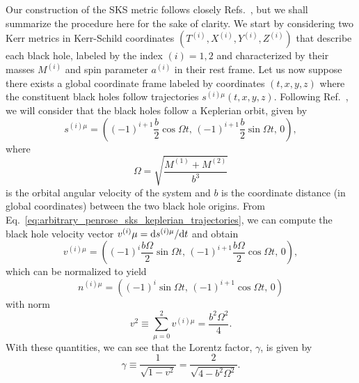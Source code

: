 Our construction of the SKS metric follows closely Refs.~\cite{Armengol:2021shd, PhysRevD.104.044041}, but we shall summarize the procedure here for the sake of clarity. We start by considering two Kerr metrics in Kerr-Schild coordinates $(T^{(i)}, X^{(i)}, Y^{(i)}, Z^{(i)})$ that describe each black hole, labeled by the index $(i) = 1,2$ and characterized by their masses $M^{(i)}$ and spin parameter $a^{(i)}$ in their rest frame. Let us now suppose there exists a global coordinate frame labeled by coordinates $(t,x,y,z)$ where the constituent black holes follow trajectories $s^{(i) \mu}(t, x, y, z)$. Following Ref.~\cite{Armengol:2021shd}, we will consider that the black holes follow a Keplerian orbit, given by
%
\begin{equation}
  s^{(i) \mu} = \left( (-1)^{i + 1}\frac{b}{2}\cos\Omega t,\, (-1)^{i + 1}\frac{b}{2}\sin\Omega t,\, 0 \right),
  \label{eq:arbitrary_penrose_sks_keplerian_trajectories}
\end{equation}
%
where
%
\begin{equation}
  \Omega = \sqrt{\frac{M^{(1)} + M^{(2)}}{b^3}}
  \label{eq:arbitrary_penrose_sks_angular_velocity}
\end{equation}
%
is the orbital angular velocity of the system and $b$ is the coordinate distance (in global coordinates) between the two black hole origins. From Eq.~\eqref{eq:arbitrary_penrose_sks_keplerian_trajectories}, we can compute the black hole velocity vector $v^{(i)} \mu = \mathrm{d} s^{(i) \mu} / \mathrm{d} t$ and obtain
%
\begin{equation}
  v^{(i) \mu} = \left( (-1)^i \frac{b\Omega}{2} \sin \Omega t,\, (-1)^{i+1} \frac{b\Omega}{2} \cos\Omega t,\, 0 \right),
  \label{eq:arbitrary_penrose_sks_keplerian_velocities}
\end{equation}
%
which can be normalized to yield
%
\begin{equation}
  n^{(i) \mu} = \left( (-1)^i \sin\Omega t,\, (-1)^{i+1}\cos\Omega t,\, 0 \right)
  \label{eq:arbitrary_penrose_sks_keplerian_velocities_norms}
\end{equation}
%
with norm
%
\begin{equation}
  v^2 \equiv \sum_{\mu = 0}^{2} v^{(i) \mu} = \frac{b^2 \Omega^2}{4}.
  \label{eq:arbitrary_penrose_sks_keplerian_velocities_norm}
\end{equation}
%
With these quantities, we can see that the Lorentz factor, $\gamma$, is given by
%
\begin{equation}
  \gamma \equiv \frac{1}{\sqrt{1 - v^2}} = \frac{2}{\sqrt{4 - b^2\Omega^2}}.
  \label{eq:arbitrary_penrose_sks_keplerian_orbit_lorentz_factor}
\end{equation}
